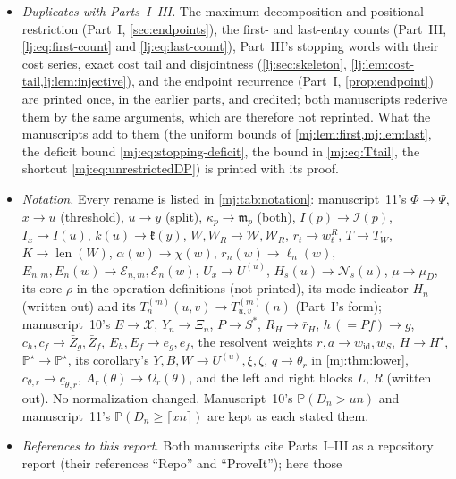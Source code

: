\documentclass[11pt,a4paper]{article}
\theoremstyle{definition}\newaliascnt{definition}{theorem}
\theoremstyle{remark}\newaliascnt{remark}{theorem}
\newcommand{\ljP}{\mathbb P}
\newcommand{\mjlen}{\operatorname{len}}
\begin{document}
\begin{itemize}
 $\mathcal I(1)=1$, and manuscript~10's integral forms equal manuscript~11's
 $\mathfrak m_p$ at $p=3/2$ and $p=3$ numerically and in general by the
 substitution of \cref{mj:thm:moments}); and the small-$u$ tail, which is
 Part~III's $3/\sqrt{\pi d}$.
\item \emph{Duplicates with Parts~I--III.} The maximum decomposition and
 positional restriction (Part~I, \cref{sec:endpoints}), the first- and
 last-entry counts (Part~III, \eqref{lj:eq:first-count} and
 \eqref{lj:eq:last-count}), Part~III's stopping words with their cost series,
 exact cost tail and disjointness (\cref{lj:sec:skeleton},
 \cref{lj:lem:cost-tail,lj:lem:injective}), and the endpoint recurrence
 (Part~I, \cref{prop:endpoint}) are printed once, in the earlier parts, and
 credited; both manuscripts rederive them by the same arguments, which are
 therefore not reprinted. What the manuscripts add to them (the uniform
 bounds of \cref{mj:lem:first,mj:lem:last}, the deficit bound
 \eqref{mj:eq:stopping-deficit}, the bound in \eqref{mj:eq:Ttail}, the
 shortcut \eqref{mj:eq:unrestrictedDP}) is printed with its proof.
\item \emph{Notation.} Every rename is listed in \cref{mj:tab:notation}:
 manuscript~11's $\Phi\to\Psi$, $x\to u$ (threshold), $u\to y$ (split),
 $\kappa_p\to\mathfrak m_p$ (both), $I(p)\to\mathcal I(p)$, $I_x\to I(u)$,
 $k(u)\to\mathfrak k(y)$, $W,W_R\to\mathcal W,\mathcal W_R$,
 $r_t\to w^R_t$, $T\to T_W$, $K\to\mjlen(W)$, $\alpha(w)\to\chi(w)$,
 $r_n(w)\to\ell_n(w)$, $E_{n,m},E_n(w)\to\mathcal E_{n,m},\mathcal E_n(w)$,
 $U_x\to U^{(u)}$, $H_s(u)\to\mathcal N_s(u)$, $\mu\to\mu_D$, its core
 $\rho$ in the operation definitions (not printed), its mode indicator $H_n$
 (written out) and its $T_n^{(m)}(u,v)\to T^{(m)}_{u,v}(n)$ (Part~I's form);
 manuscript~10's $E\to\mathcal X$, $Y_n\to\Xi_n$, $P\to S^\ast$,
 $R_H\to\bar r_H$, $h\,(=Pf)\to g$, $c_h,c_f\to\bar Z_g,\bar Z_f$,
 $E_h,E_f\to e_g,e_f$, the resolvent weights $r,a\to w_{\mathrm{id}},w_S$,
 $H\to H^\star$, $\mathbb P^\star\to\ljP^\star$, its corollary's
 $Y,B,W\to U^{(u)},\xi,\zeta$, $q\to\theta_r$ in \cref{mj:thm:lower},
 $c_{\theta,r}\to\underline c_{\theta,r}$, $A_r(\theta)\to\Omega_r(\theta)$,
 and the left and right blocks $L$, $R$ (written out). No normalization
 changed. Manuscript~10's $\ljP(D_n>un)$ and manuscript~11's
 $\ljP(D_n\ge\lceil xn\rceil)$ are kept as each stated them.
\item \emph{References to this report.} Both manuscripts cite Parts~I--III as
 a repository report (their references ``Repo'' and ``ProveIt''); here those

\end{itemize}
\end{document}
